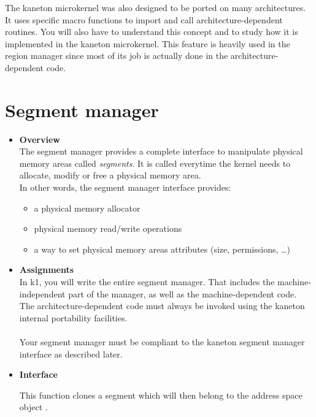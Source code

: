 The kaneton microkernel was also designed to be ported on many
architectures. It uses specific macro functions to import and call
architecture-dependent routines. You will also have
to understand this concept and to study how it is implemented in the
kaneton microkernel. This feature is heavily used in the region manager since
most of its job is actually done in the architecture-dependent code.

%
%

\newpage

\section{Segment manager}

\begin{itemize}
  \item {\bf Overview}\\
    The segment manager provides a complete interface to manipulate physical
    memory areas called {\em segments}. It is called everytime the kernel
    needs to allocate, modify or free a physical memory area.\\

    In other words, the segment manager interface provides:
    \begin{itemize}
    \item a physical memory allocator
    \item physical memory read/write operations
    \item a way to set physical memory areas attributes (size, permissions, \ldots)\\
      \end{itemize}

  \item {\bf Assignments}\\
    In k1, you will write the entire segment manager. That includes the
    machine-independent part of the manager, as well as the machine-dependent
    code.\\

    The architecture-dependent code must always be invoked using the kaneton
    internal portability facilities.\\
    \\
    Your segment manager must be compliant to the kaneton segment manager
    interface as described later.\\

  \item {\bf Interface}\\
             {
               This function clones a segment which will then belong to
               the address space object .

}
\end{itemize}
